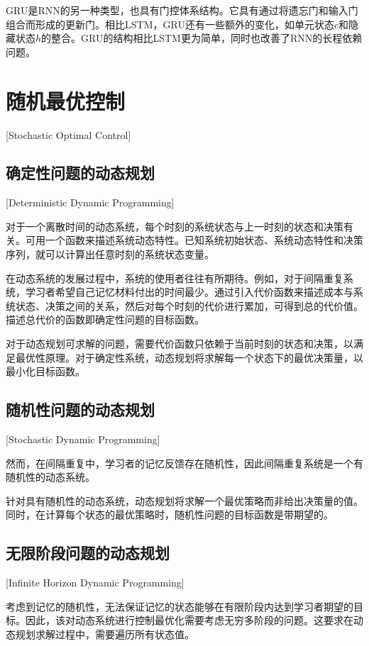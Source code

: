 GRU是RNN的另一种类型，也具有门控体系结构。它具有通过将遗忘门和输入门组合而形成的更新门。相比LSTM，GRU还有一些额外的变化，如单元状态$c$和隐藏状态$h$的整合。GRU的结构相比LSTM更为简单，同时也改善了RNN的长程依赖问题。

\section{随机最优控制}[Stochastic Optimal Control]

\subsection{确定性问题的动态规划}[Deterministic Dynamic Programming]

对于一个离散时间的动态系统，每个时刻的系统状态与上一时刻的状态和决策有关。可用一个函数来描述系统动态特性。已知系统初始状态、系统动态特性和决策序列，就可以计算出任意时刻的系统状态变量\cite[2-4]{bertsekasReinforcementLearningOptimal2019}。

在动态系统的发展过程中，系统的使用者往往有所期待。例如，对于间隔重复系统，学习者希望自己记忆材料付出的时间最少。通过引入代价函数来描述成本与系统状态、决策之间的关系，然后对每个时刻的代价进行累加，可得到总的代价值。描述总代价的函数即确定性问题的目标函数。

对于动态规划可求解的问题，需要代价函数只依赖于当前时刻的状态和决策，以满足最优性原理。对于确定性系统，动态规划将求解每一个状态下的最优决策量，以最小化目标函数。

\subsection{随机性问题的动态规划}[Stochastic Dynamic Programming]

然而，在间隔重复中，学习者的记忆反馈存在随机性，因此间隔重复系统是一个有随机性的动态系统。

针对具有随机性的动态系统，动态规划将求解一个最优策略而非给出决策量的值。同时，在计算每个状态的最优策略时，随机性问题的目标函数是带期望的\cite[14-16]{bertsekasReinforcementLearningOptimal2019}。

\subsection{无限阶段问题的动态规划}[Infinite Horizon Dynamic Programming]

考虑到记忆的随机性，无法保证记忆的状态能够在有限阶段内达到学习者期望的目标。因此，该对动态系统进行控制最优化需要考虑无穷多阶段的问题。这要求在动态规划求解过程中，需要遍历所有状态值。

